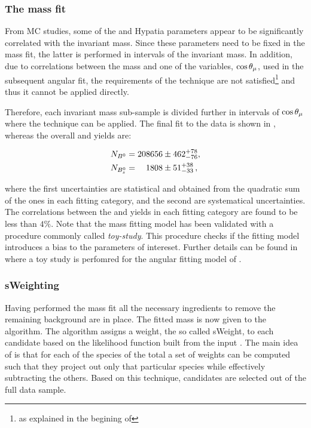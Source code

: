 \subsubsection{The mass fit}
From MC studies, some of the \Bs and \Bd Hypatia parameters appear to be significantly correlated with the \mkpi invariant mass.
Since these parameters need to be fixed in the mass fit, the latter is performed in intervals of the
\mkpi invariant mass. In addition, due to correlations between the mass and one of the variables, $\cos\theta_{\mu}$, used in
the subsequent angular fit, the requirements of the \sPlot technique are not satisfied\footnote{as explained in the begining
of } and thus it cannot be applied directly.

Therefore, each \mkpi invariant mass sub-sample is divided further in intervals of $\cos\theta_{\mu}$ where the \sPlot technique
can be applied. The final fit to the data is shown in , whereas the overall \Bs and \Bd yields are:

\begin{align}
  \centering
  N_{\Bd} &= 208656  \pm  462 ^{+ 78	}_{- 76}, \\
  N_{\Bs} &= \phantom{00}1808  \pm   51 ^{+ 38	}_{- 33} \, ,
  \label{signal_yields}
\end{align}

\noindent where the first uncertainties are statistical and obtained from the quadratic sum of the ones in each fitting category,
and the second are systematical uncertainties. The correlations between the \Bd and \Bs yields in each fitting category
are found to be less than $4\%$. Note that the mass fitting model has been validated with a procedure commonly called {\it toy-study}.
This procedure checks if the fitting model introduces a bias to the parameters of intereset. Further details can be found in
 where a toy study is perfomred for the angular fitting model of .

\subsubsection{sWeighting}
Having performed the mass fit all the necessary ingredients to remove the remaining background are in place.
The fitted mass \pdf is now given to the \sPlot algorithm. The algorithm assigns a weight, the so called sWeight, to each candidate
based on the likelihood function built from the input \pdf. The main idea of \sPlot is that for each of the species of the total
\pdf a set of weights can be computed such that they project out only that particular species while effectively subtracting the others.
Based on this technique, \BsJpsiKst candidates are selected out of the full data sample.

